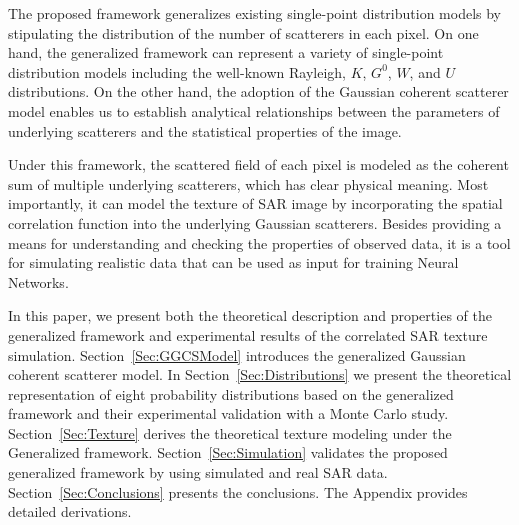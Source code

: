 \documentclass[journal]{IEEEtran}
\begin{document}
The proposed framework generalizes existing single-point distribution models by stipulating the distribution of the number of scatterers in each pixel.
On one hand, the generalized framework can represent a variety of single-point distribution models including the well-known Rayleigh, $K$, $G^0$, $W$, and $U$ distributions.
On the other hand, the adoption of the Gaussian coherent scatterer model enables us to establish analytical relationships between the parameters of underlying scatterers and the statistical properties of the image.

Under this framework, the scattered field of each pixel is modeled as the coherent sum of multiple underlying scatterers, which has clear physical meaning.
Most importantly, it can model the texture of SAR image by incorporating the spatial correlation function into the underlying Gaussian scatterers.
Besides providing a means for understanding and checking the properties of observed data, it is a tool for simulating realistic data that can be used as input for training Neural Networks.

In this paper, we present both the theoretical description and properties of the generalized framework and experimental results of the correlated SAR texture simulation.
Section~\ref{Sec:GGCSModel} introduces the generalized Gaussian coherent scatterer model.
In Section~\ref{Sec:Distributions} we present the theoretical representation of eight probability distributions based on the generalized framework and their experimental validation with a Monte Carlo study.
Section~\ref{Sec:Texture} derives the theoretical texture modeling under the Generalized framework.
Section~\ref{Sec:Simulation} validates the proposed generalized framework by using simulated and real SAR data.
Section~\ref{Sec:Conclusions} presents the conclusions.
The Appendix provides detailed derivations.
\end{document}
